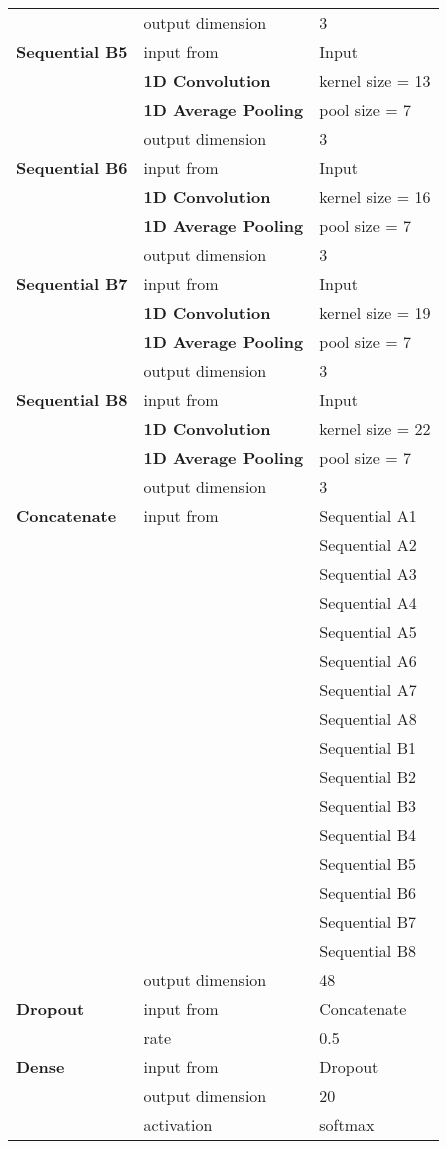 \begin{appendices}
\begin{tabularx}{\textwidth}[!h]{X X X}
	& output dimension & 3\\
	[8pt]
	\textbf{Sequential B5} & input from & Input\\
	& \textbf{1D Convolution} & kernel size = 13\\
	& \textbf{1D Average Pooling} & pool size = 7\\
	& output dimension & 3\\
	[8pt]
	\textbf{Sequential B6} & input from & Input\\
	& \textbf{1D Convolution} & kernel size = 16\\
	& \textbf{1D Average Pooling} & pool size = 7\\
	& output dimension & 3\\
	[8pt]
	\textbf{Sequential B7} & input from & Input\\
	& \textbf{1D Convolution} & kernel size = 19\\
	& \textbf{1D Average Pooling} & pool size = 7\\
	& output dimension & 3\\
	[8pt]
	\textbf{Sequential B8} & input from & Input\\
	& \textbf{1D Convolution} & kernel size = 22\\
	& \textbf{1D Average Pooling} & pool size = 7\\
	& output dimension & 3\\
	[8pt]
	\textbf{Concatenate} & input from & Sequential A1\\
	& & Sequential A2\\
	& & Sequential A3\\
	& & Sequential A4\\
	& & Sequential A5\\
	& & Sequential A6\\
	& & Sequential A7\\
	& & Sequential A8\\
	& & Sequential B1\\
	& & Sequential B2\\
	& & Sequential B3\\
	& & Sequential B4\\
	& & Sequential B5\\
	& & Sequential B6\\
	& & Sequential B7\\
	& & Sequential B8\\
	& output dimension & 48\\
	[8pt]
	\textbf{Dropout} & input from & Concatenate\\
	& rate & 0.5\\
	[8pt]
	\textbf{Dense} & input from & Dropout\\
	& output dimension & 20\\
	& activation & softmax\\
	\hline
\end{tabularx}



\end{appendices}
